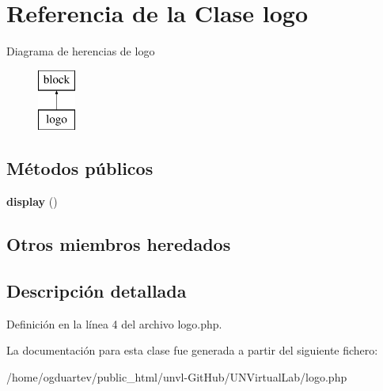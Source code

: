 \hypertarget{classlogo}{}\section{Referencia de la Clase logo}
\label{classlogo}
Diagrama de herencias de logo\begin{figure}[H]
\begin{center}
\leavevmode
\includegraphics[height=2.000000cm]{classlogo}
\end{center}
\end{figure}
\subsection*{Métodos públicos}
\begin{DoxyCompactItemize}
\item 
\mbox{\label{classlogo_a5dbc2e33bf0508b4ce4833f2799c1b99}} 
{\bfseries display} ()
\end{DoxyCompactItemize}
\subsection*{Otros miembros heredados}


\subsection{Descripción detallada}


Definición en la línea 4 del archivo logo.\+php.



La documentación para esta clase fue generada a partir del siguiente fichero\+:\begin{DoxyCompactItemize}
\item 
/home/ogduartev/public\+\_\+html/unvl-\/\+Git\+Hub/\+U\+N\+Virtual\+Lab/logo.\+php\end{DoxyCompactItemize}
